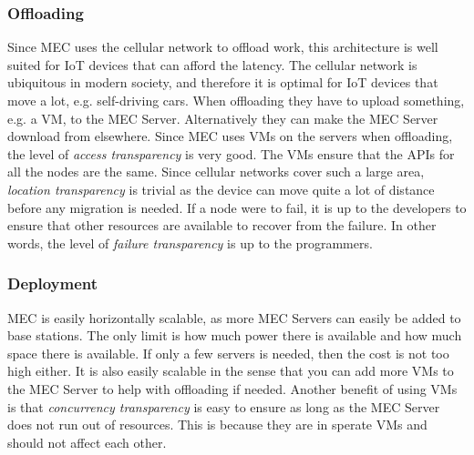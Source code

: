 \subsubsection{Offloading}
Since MEC uses the cellular network to offload work, this architecture is well suited for IoT devices that can afford the latency. The cellular network is ubiquitous in modern society, and therefore it is optimal for IoT devices that move a lot, e.g. self-driving cars. When offloading they have to upload something, e.g. a VM, to the MEC Server. Alternatively they can make the MEC Server download from elsewhere. Since MEC uses VMs on the servers when offloading, the level of \textit{access transparency} is very good. The VMs ensure that the APIs for all the nodes are the same. Since cellular networks cover such a large area, \textit{location transparency} is trivial as the device can move quite a lot of distance before any migration is needed. If a node were to fail, it is up to the developers to ensure that other resources are available to recover from the failure. In other words, the level of \textit{failure transparency} is up to the programmers.

\subsubsection{Deployment}
MEC is easily horizontally scalable, as more MEC Servers can easily be added to base stations. The only limit is how much power there is available and how much space there is available. If only a few servers is needed, then the cost is not too high either. It is also easily scalable in the sense that you can add more VMs to the MEC Server to help with offloading if needed. Another benefit of using VMs is that \textit{concurrency transparency} is easy to ensure as long as the MEC Server does not run out of resources. This is because they are in sperate VMs and should not affect each other.








